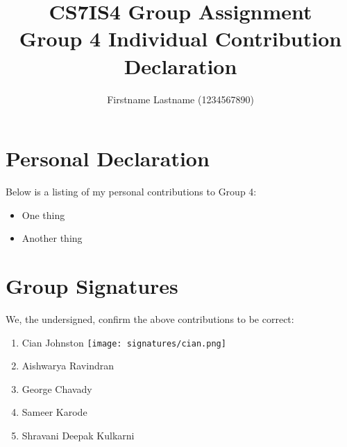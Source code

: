 \documentclass[a4paper,10pt]{article}
\begin{document}
\title{
    CS7IS4 Group Assignment \\
    \large Group 4 Individual Contribution Declaration
}
\author{
    Firstname Lastname (1234567890)
}

\maketitle

\section{Personal Declaration}

Below is a listing of my personal contributions to Group 4:

\begin{itemize}
    \item{
        One thing
    }
    \item{
        Another thing
    }
\end{itemize}

\section{Group Signatures}

We, the undersigned, confirm the above contributions to be correct:

\begin{enumerate}
    \item{
        Cian Johnston \texttt{[image: signatures/cian.png]}
    }
    \item{
        Aishwarya Ravindran
    }
    \item{
        George Chavady
    }
    \item{
        Sameer Karode
    }
    \item{
        Shravani Deepak Kulkarni
    }

\end{enumerate}
\end{document}
